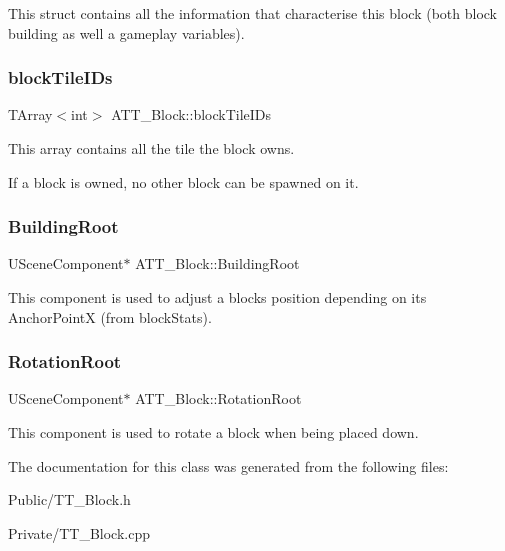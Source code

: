 This struct contains all the information that characterise this block (both block building as well a gameplay variables). 

\mbox{\label{class_a_t_t___block_a1400fda284071cdf74fbe6a6bd60b935}} 
\subsubsection{\texorpdfstring{blockTileIDs}{blockTileIDs}}
{\footnotesize\ttfamily T\+Array$<$int$>$ A\+T\+T\+\_\+\+Block\+::block\+Tile\+I\+Ds\hspace{0.3cm}{\ttfamily [protected]}}



This array contains all the tile the block owns. 

If a block is owned, no other block can be spawned on it. \mbox{\label{class_a_t_t___block_a1be1a5aea523a1a265eb0751e16b12d7}} 
\subsubsection{\texorpdfstring{BuildingRoot}{BuildingRoot}}
{\footnotesize\ttfamily U\+Scene\+Component$\ast$ A\+T\+T\+\_\+\+Block\+::\+Building\+Root\hspace{0.3cm}{\ttfamily [protected]}}



This component is used to adjust a block\textquotesingle{}s position depending on its Anchor\+PointX (from block\+Stats). 

\mbox{\label{class_a_t_t___block_ab40e055cf024e6c2a96c8351fc76395d}} 
\subsubsection{\texorpdfstring{RotationRoot}{RotationRoot}}
{\footnotesize\ttfamily U\+Scene\+Component$\ast$ A\+T\+T\+\_\+\+Block\+::\+Rotation\+Root}



This component is used to rotate a block when being placed down. 



The documentation for this class was generated from the following files\+:\begin{DoxyCompactItemize}
\item 
Public/T\+T\+\_\+\+Block.\+h\item 
Private/T\+T\+\_\+\+Block.\+cpp\end{DoxyCompactItemize}
